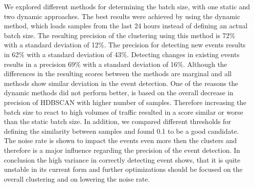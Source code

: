 We explored different methods for determining the batch size, with one static and two dynamic approaches.
The best results were achieved by using the dynamic method,
which loads samples from the last 24 hours instead of defining an actual batch size.
The resulting precision of the clustering using this method is 72\% with a standard deviation of 12\%.
The precision for detecting new events results in 62\% with a standard deviation of 43\%.
Detecting changes in existing events results in a precision 69\% with a standard deviation of 16\%.
Although the differences in the resulting scores between the methods are marginal
and all methods show similar deviation in the event detection.
One of the reasons the dynamic methods did not perform better,
is based on the overall decrease in precision of HDBSCAN with higher number of samples.
Therefore increasing the batch size to react to high volumes of traffic
resulted in a score similar or worse than the static batch size.
In addition, we compared different thresholds for defining the similarity between samples
and found 0.1 to be a good candidate.
The noise rate is shown to impact the events even more then the clusters
and therefore is a major influence regarding the precision of the event detection.
In conclusion the high variance in correctly detecting event shows,
that it is quite unstable in its current form and further optimizations should be focused
on the overall clustering and on lowering the noise rate.
